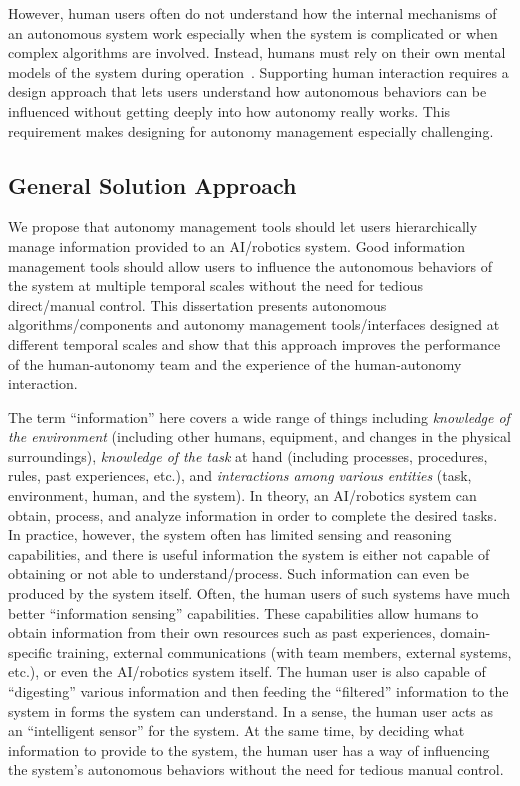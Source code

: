 However, human users often do not understand how the internal mechanisms of an autonomous system work especially when the system is complicated or when complex algorithms are involved. Instead, humans must rely on their own mental models of the system during operation~\cite{Moray1999Mental}. Supporting human interaction requires a design approach that lets users understand how autonomous behaviors can be influenced without getting deeply into how autonomy really works. This requirement makes designing for autonomy management especially challenging.

\subsection{General Solution Approach}

We propose that autonomy management tools should let users hierarchically manage information provided to an AI/robotics system. Good information management tools should allow users to influence the autonomous behaviors of the system at multiple temporal scales without the need for tedious direct/manual control. This dissertation presents autonomous algorithms/components and autonomy management tools/interfaces designed at different temporal scales and show that this approach improves the performance of the human-autonomy team and the experience of the human-autonomy interaction.

The term ``information'' here covers a wide range of things including \textit{knowledge of the environment} (including other humans, equipment, and changes in the physical surroundings), \textit{knowledge of the task} at hand (including processes, procedures, rules, past experiences, etc.), and \textit{interactions among various entities} (task, environment, human, and the system). In theory, an AI/robotics system can obtain, process, and analyze information in order to complete the desired tasks. In practice, however, the system often has limited sensing and reasoning capabilities, and there is useful information the system is either not capable of obtaining or not able to understand/process. Such information can even be produced by the system itself. Often, the human users of such systems have much better ``information sensing'' capabilities. These capabilities allow humans to obtain information from their own resources such as past experiences, domain-specific training, external communications (with team members, external systems, etc.), or even the AI/robotics system itself. The human user is also capable of ``digesting'' various information and then feeding the ``filtered'' information to the system in forms the system can understand. In a sense, the human user acts as an ``intelligent sensor'' for the system. At the same time, by deciding what information to provide to the system, the human user has a way of influencing the system's autonomous behaviors without the need for tedious manual control.


